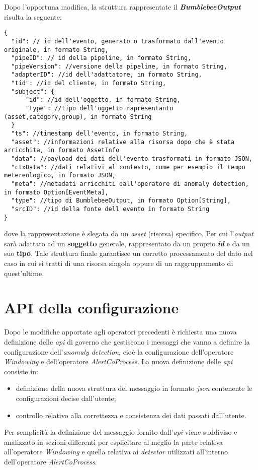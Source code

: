 Dopo l'opportuna modifica, la struttura rappresentate il \textbf{\textit{BumblebeeOutput}} risulta la seguente:

\begin{verbatim}
{
  "id": // id dell'evento, generato o trasformato dall'evento originale, in formato String,
  "pipeID": // id della pipeline, in formato String,
  "pipeVersion": //versione della pipeline, in formato String,
  "adapterID": //id dell'adattatore, in formato String,
  "tid": //id del cliente, in formato String,
  "subject": {
	  "id": //id dell'oggetto, in formato String,
	  "type": //tipo dell'oggetto rapresentanto (asset,category,group), in formato String
  }
  "ts": //timestamp dell'evento, in formato String,
  "asset": //informazioni relative alla risorsa dopo che è stata arricchita, in formato AssetInfo
  "data": //payload dei dati dell'evento trasformati in formato JSON,
  "ctxData": //dati relativi al contesto, come per esempio il tempo metereologico, in formato JSON,
  "meta": //metadati arricchiti dall'operatore di anomaly detection, in formato Option[EventMeta],
  "type": //tipo di BumblebeeOutput, in formato Option[String],
  "srcID": //id della fonte dell'evento in formato String
}
\end{verbatim}
dove la rappresentazione è slegata da un \textit{asset} (risorsa) specifico. Per cui l'\textit{output} sarà adattato ad un \textbf{soggetto} generale, rappresentato da un proprio \textbf{\textit{id}} e da un suo \textbf{tipo}.
Tale struttura finale garantisce un corretto processamento del dato nel caso in cui si tratti di una risorsa singola oppure di un raggruppamento di quest'ultime.


\section{API della configurazione}
Dopo le modifiche apportate agli operatori precedenti è richiesta una nuova definizione delle \textit{\gls{api}} di governo che gestiscono i messaggi che vanno a definire la configurazione dell'\textit{anomaly detection}, cioè la configurazione dell'operatore \textit{Windowing} e dell'operatore \textit{AlertCoProcess}. La nuova definizione delle \textit{\gls{api}} consiste in:

\begin{itemize}
	\item{definizione della nuova struttura del messaggio in formato \textit{\gls{json}} contenente le configurazioni decise dall'utente;}
	\item{controllo relativo alla correttezza e consistenza dei dati passati dall'utente.}
\end{itemize}
Per semplicità la definizione del messaggio fornito dall'\textit{\gls{api}} viene suddiviso e analizzato in sezioni differenti per esplicitare al meglio la parte relativa all'operatore \textit{Windowing} e quella relativa ai \textit{detector} utilizzati all'interno dell'operatore \textit{AlertCoProcess}.




